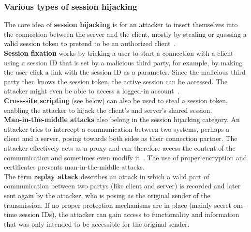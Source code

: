 \documentclass[
a4paper,
pagesize,
pdftex,
12pt,
twoside, %
BCOR=5mm, %
ngerman,
fleqn,
final,
]{scrartcl}
\begin{document}
	
	\subsubsection{Various types of session hijacking}
	The core idea of \textbf{session hijacking} is for an attacker to insert themselves into the connection between the server and the client, mostly by stealing or guessing a valid session token to pretend to be an authorized client~\cite{OWASPFoundation.14.8.2014}.\\
	\textbf{Session fixation} works by tricking a user to start a connection with a client using a session ID that is set by a malicious third party, for example, by making the user click a link with the session ID as a parameter. Since the malicious third party then knows the session token, the active session can be accessed. The attacker might even be able to access a logged-in account~\cite{OWASPFoundation.14.8.2014}.\\
	\textbf{Cross-site scripting} (see below) can also be used to steal a session token, enabling the attacker to hijack the client's and server's shared session.\\
	\textbf{Man-in-the-middle attacks} also belong in the session hijacking category. An attacker tries to intercept a communication between two systems, perhaps a client and a server, posing towards both sides as their connection partner. The attacker effectively acts as a proxy and can therefore access the content of the communication and sometimes even modify it~\cite{OWASPFoundation.31.8.2015}. The use of proper encryption and certificates prevents man-in-the-middle attacks.\\
	The term \textbf{replay attack} describes an attack in which a valid part of communication between two partys (like client and server) is recorded and later sent again by the attacker, who is posing as the original sender of the transmission. If no proper protection mechanisms are in place (mainly secret one-time session IDs), the attacker can gain access to functionality and information that was only intended to be accessible for the original sender.
	
\end{document}
